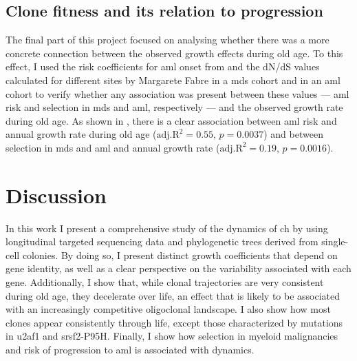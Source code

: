 \subsection{Clone fitness and its relation to progression}

The final part of this project focused on analysing whether there was a more concrete connection between the observed growth effects during old age. To this effect, I used the risk coefficients for \ac{aml} onset from \cite{Abelson2018-wh} and the dN/dS values calculated for different sites by Margarete Fabre in a \ac{mds} cohort and in an \ac{aml} cohort to verify whether any association was present between these values --- \ac{aml} risk and selection in \ac{mds} and \ac{aml}, respectively --- and the observed growth rate during old age. As shown in , there is a clear association between \ac{aml} risk and annual growth rate during old age ($\mathrm{adj. R}^2=0.55$, $p=0.0037$) and between selection in \ac{mds} and \ac{aml} and annual growth rate ($\mathrm{adj. R}^2=0.19$, $p=0.0016$).

\begin{figure}[!ht]
	\label{fig:ch-risk-selection}
\end{figure}

\FloatBarrier

\section{Discussion}

In this work I present a comprehensive study of the dynamics of \ac{ch} by using longitudinal targeted sequencing data and phylogenetic trees derived from single-cell colonies. By doing so, I present distinct growth coefficients that depend on gene identity, as well as a clear perspective on the variability associated with each gene. Additionally, I show that, while clonal trajectories are very consistent during old age, they decelerate over life, an effect that is likely to be associated with an increasingly competitive oligoclonal landscape. I also show how most clones appear consistently through life, except those characterized by mutations in \ac{u2af1} and \ac{srsf2}-P95H. Finally, I show how selection in myeloid malignancies and risk of progression to \ac{aml} is associated with dynamics.

